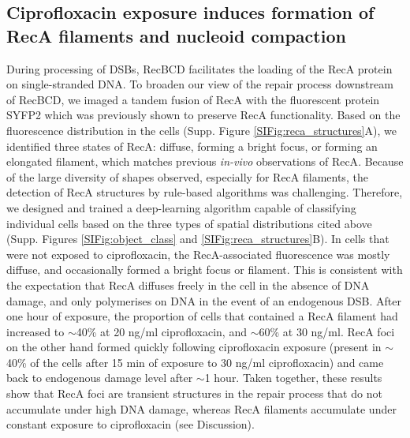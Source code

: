 \subsection*{Ciprofloxacin exposure induces formation of RecA filaments and nucleoid compaction}

During processing of DSBs, RecBCD facilitates the loading of the RecA protein on single-stranded DNA. To broaden our view of the repair process downstream of RecBCD, we imaged a tandem fusion of RecA with the fluorescent protein SYFP2 which was previously shown to preserve RecA functionality\cite{Wiktor2021}. Based on the fluorescence distribution in the cells (Supp. Figure \ref{SIFig:reca_structures}A), we identified three states of RecA: diffuse, forming a bright focus, or forming an elongated filament, which matches previous \emph{in-vivo} observations of RecA\cite{Wiktor2021}. Because of the large diversity of shapes observed, especially for RecA filaments, the detection of RecA structures by rule-based algorithms was challenging. Therefore, we designed and trained a deep-learning algorithm capable of classifying individual cells based on the three types of spatial distributions cited above (Supp. Figures \ref{SIFig:object_class} and \ref{SIFig:reca_structures}B). In cells that were not exposed to ciprofloxacin, the RecA-associated fluorescence was mostly diffuse, and occasionally formed a bright focus or filament. This is consistent with the expectation that RecA diffuses freely in the cell in the absence of DNA damage, and only polymerises on DNA in the event of an endogenous DSB. After one hour of exposure, the proportion of cells that contained a RecA filament had increased to $\sim$40\% at 20 ng/ml ciprofloxacin, and $\sim$60\% at 30 ng/ml. RecA foci on the other hand formed quickly following ciprofloxacin exposure (present in $\sim$40\% of the cells after 15 min of exposure to 30 ng/ml ciprofloxacin) and came back to endogenous damage level after $\sim$1 hour. Taken together, these results show that RecA foci are transient structures in the repair process that do not accumulate under high DNA damage, whereas RecA filaments accumulate under constant exposure to ciprofloxacin (see Discussion).
